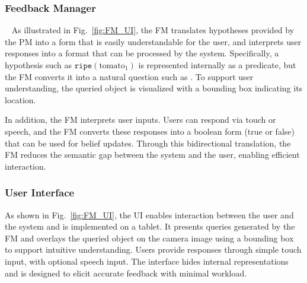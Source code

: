 \subsubsection{Feedback Manager}~\label{method:FM}
As illustrated in Fig.~\ref{fig:FM_UI}, the FM translates hypotheses provided by the PM into a form that is easily understandable for the user, and interprets user responses into a format that can be processed by the system. Specifically, a hypothesis such as $\texttt{ripe}(\text{tomato}_1)$ is represented internally as a predicate, but the FM converts it into a natural question such as . To support user understanding, the queried object is visualized with a bounding box indicating its location.

In addition, the FM interprets user inputs. Users can respond via touch or speech, and the FM converts these responses into a boolean form (true or false) that can be used for belief updates. Through this bidirectional translation, the FM reduces the semantic gap between the system and the user, enabling efficient interaction.

\subsubsection{User Interface}
As shown in Fig.~\ref{fig:FM_UI}, the UI enables interaction between the user and the system and is implemented on a tablet. It presents queries generated by the FM and overlays the queried object on the camera image using a bounding box to support intuitive understanding. Users provide responses through simple touch input, with optional speech input. The interface hides internal representations and is designed to elicit accurate feedback with minimal workload.


